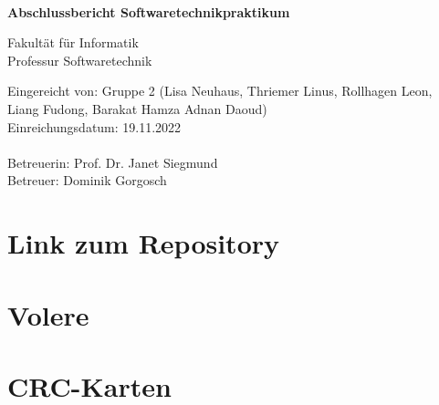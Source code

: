 \documentclass[a4paper, 12pt, oneside, BCOR1cm,toc=chapterentrywithdots]{scrbook}
\begin{document}
%
%

\begin{titlepage}

{
    \begin{center}
        \\
    \end{center}
    \vspace{0.5cm}
}

\begin{center}

\LARGE{\textbf{Abschlussbericht Softwaretechnikpraktikum}}\\
\vspace{1.5cm}


\vspace{1cm}

Fakultät für Informatik\\
Professur Softwaretechnik
\end{center}
\vspace{3cm}
Eingereicht von: Gruppe 2 (Lisa Neuhaus, Thriemer Linus, Rollhagen Leon, Liang Fudong, Barakat Hamza Adnan Daoud)\\
Einreichungsdatum: 19.11.2022\\
\vspace{0.3cm}\\
Betreuerin: Prof. Dr. Janet Siegmund \\
Betreuer: Dominik Gorgosch

\end{titlepage}
\chapter{Link zum Repository}


\chapter{Volere}





\chapter{CRC-Karten}

\end{document}
